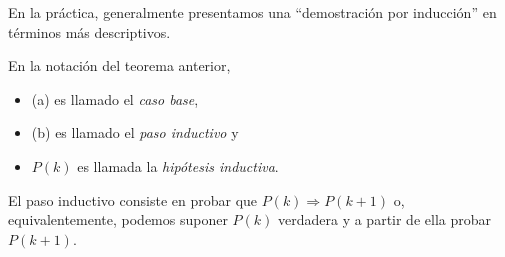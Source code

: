\documentclass[handout]{beamer} %
\begin{document}
\begin{frame}	

	
		En la práctica, generalmente presentamos una ``demostración por
	inducción'' en términos más descriptivos. 
	
	\medskip
	
	En la notación del teorema anterior, 
	\medskip
	\begin{itemize}
		\item (a) es llamado  el {\em caso base},
		\item  (b) es llamado el  {\em paso inductivo} y
		\item  $P(k)$ es llamada la {\em hipótesis inductiva}.
	\end{itemize}
	\medskip
	 El paso inductivo  consiste en probar que $P(k) \Rightarrow P(k + 1)$ o, equivalentemente, podemos suponer $P(k)$ verdadera y a partir de ella probar $P(k + 1)$. 
	
\end{frame}

\end{document}
